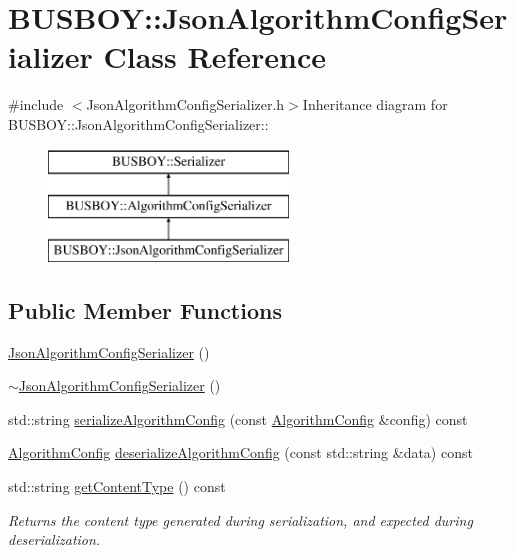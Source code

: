 \hypertarget{classBUSBOY_1_1JsonAlgorithmConfigSerializer}{
\section{BUSBOY::JsonAlgorithmConfigSerializer Class Reference}
\label{classBUSBOY_1_1JsonAlgorithmConfigSerializer}
}


{\ttfamily \#include $<$JsonAlgorithmConfigSerializer.h$>$}Inheritance diagram for BUSBOY::JsonAlgorithmConfigSerializer::\begin{figure}[H]
\begin{center}
\leavevmode
\includegraphics[height=3cm]{classBUSBOY_1_1JsonAlgorithmConfigSerializer}
\end{center}
\end{figure}
\subsection*{Public Member Functions}
\begin{DoxyCompactItemize}
\item 
\hyperlink{classBUSBOY_1_1JsonAlgorithmConfigSerializer_a1338af3f653611d736cbb671dc2ddb66}{JsonAlgorithmConfigSerializer} ()
\item 
\hyperlink{classBUSBOY_1_1JsonAlgorithmConfigSerializer_ad23e85998d030ce5cfd820cdeb86adae}{$\sim$JsonAlgorithmConfigSerializer} ()
\item 
std::string \hyperlink{classBUSBOY_1_1JsonAlgorithmConfigSerializer_af364fc4f8156013bdc1957c9a10d4eed}{serializeAlgorithmConfig} (const \hyperlink{classBUSBOY_1_1AlgorithmConfig}{AlgorithmConfig} \&config) const 
\item 
\hyperlink{classBUSBOY_1_1AlgorithmConfig}{AlgorithmConfig} \hyperlink{classBUSBOY_1_1JsonAlgorithmConfigSerializer_ad644fb4019e1d0596e8e91b9fa6ede54}{deserializeAlgorithmConfig} (const std::string \&data) const 
\item 
std::string \hyperlink{classBUSBOY_1_1JsonAlgorithmConfigSerializer_ab477ff6ef5cd3a5310d4716c358e16fd}{getContentType} () const 
\begin{DoxyCompactList}\small\item\em Returns the content type generated during serialization, and expected during deserialization. \item\end{DoxyCompactList}\end{DoxyCompactItemize}


